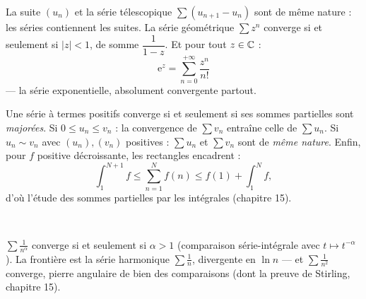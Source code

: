 \begin{theoreme}
La suite $(u_n)$ et la série télescopique $\sum(u_{n+1}-u_n)$ sont de même
nature : les séries contiennent les suites. La série géométrique
$\sum z^{n}$ converge si et seulement si $|z|<1$, de somme
$\dfrac{1}{1-z}$. Et pour tout $z\in\mathbb{C}$ :
\[
\mathrm{e}^{z}=\sum_{n=0}^{+\infty}\frac{z^{n}}{n!}
\]
— la série exponentielle, absolument convergente partout.
\end{theoreme}


\noindent
\begin{minipage}[c]{0.55\linewidth}
\begin{theoreme}[Comparaisons]
Une série à termes positifs converge si et seulement si ses sommes
partielles sont \emph{majorées}. Si $0\leqslant u_n\leqslant v_n$ : la
convergence de $\sum v_n$ entraîne celle de $\sum u_n$. Si
$u_n\sim v_n$ avec $(u_n),(v_n)$ positives : $\sum u_n$ et $\sum v_n$ sont
de \emph{même nature}. Enfin, pour $f$ positive décroissante, les
rectangles encadrent :
\[
\int_{1}^{N+1}f\leqslant\sum_{n=1}^{N}f(n)\leqslant f(1)+\int_{1}^{N}f ,
\]
d'où l'étude des sommes partielles par les intégrales (chapitre 15).
\end{theoreme}
\end{minipage}\hfill
\begin{minipage}[c]{0.41\linewidth}
\centering
{}\\[0.5mm]
\end{minipage}

\begin{theoreme}
$\displaystyle\sum\frac{1}{n^{\alpha}}$ converge si et seulement si
$\alpha>1$ (comparaison série-intégrale avec $t\mapsto t^{-\alpha}$). La
frontière est la série harmonique $\sum\frac1n$, divergente en
$\ln n$ — et $\sum\frac{1}{n^{2}}$ converge, pierre angulaire de bien des
comparaisons (dont la preuve de Stirling, chapitre 15).
\end{theoreme}

